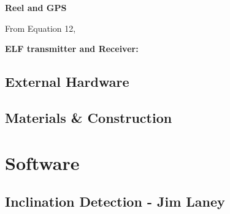 \documentclass[11pt]{article}		%
\begin{document}
	    \textbf{Reel and GPS}

        From Equation 12,





        \textbf{ELF transmitter and Receiver:}
        

		
		
		
		
		\subsection{External Hardware}
		
		
	
		\subsection{Materials \& Construction}
		
	
	\section{Software}
		
		\subsection[Inclination Detection]{Inclination Detection - Jim Laney}
		
\end{document}
